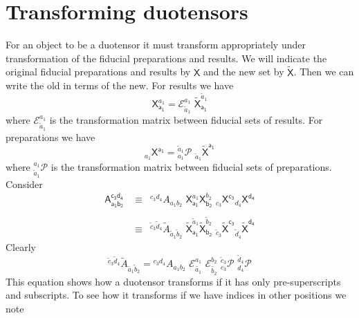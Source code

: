\documentclass[10pt]{article}
\begin{document}
\section{Transforming duotensors}\label{transformingduotensors}

For an object to be a duotensor it must transform appropriately under transformation of the fiducial preparations and results. We will indicate the original fiducial preparations and results by $\mathsf X$ and the new set by $\tilde{\mathsf X}$.  Then we can write the old in terms of the new. For results we have
\begin{equation}
\mathsf{X}_\mathsf{a_1}^{a_1} =   \mathcal{E}^{a_1}_{\tilde{a}_1} \,\, \mathsf{\tilde{X}}_\mathsf{a_1}^{\tilde{a}_1}
\end{equation}
where $\mathcal{E}^{a_1}_{\tilde{a}_1}$ is the transformation matrix between fiducial sets of results.  For preparations we have
\begin{equation}
{}_{a_1}\!\mathsf{X}^\mathsf{a_1} =   {}^{\tilde{a}_1}_{a_1}\! \mathcal{P}  \,\, {}_{\tilde{a}_1}\!\mathsf{\tilde{X}}^\mathsf{a_1}
\end{equation}
where ${}_{\tilde{a}_1}^{a_1}\!\mathcal{P}$ is the transformation matrix between fiducial sets of preparations.  Consider
\begin{eqnarray}
\mathsf{A_{a_1b_2}^{c_3d_4}} \,\,& \equiv & {}^{c_3d_4}\!A_{a_1b_2}\,\, \mathsf{X}_\mathsf{a_1}^{a_1} \mathsf{X}_\mathsf{b_2}^{b_2}  \,\,{}_{c_3}\!\mathsf{X}^\mathsf{c_3}{}_{d_4}\!\mathsf{X}^\mathsf{d_4}   \nonumber\\
& {} & \nonumber \\
& \equiv & {}^{\tilde{c}_3\tilde{d}_4}\!\tilde{A}_{\tilde{a}_1\tilde{b}_2}\,\, \mathsf{\tilde{X}}_\mathsf{{a}_1}^{\tilde{a}_1} \mathsf{\tilde{X}}_\mathsf{b_2}^{\tilde{b}_2}  \,\,{}_{\tilde{c}_3}\!\mathsf{\tilde{X}}^\mathsf{c_3}{}_{\tilde{d}_4}\!\mathsf{\tilde{X}}^\mathsf{d_4}
\nonumber
\end{eqnarray}
Clearly
\begin{equation}\label{presupsubtrans}
{}^{\tilde{c}_3\tilde{d}_4}\!\tilde{A}_{\tilde{a}_1\tilde{b}_2} =      {}^{c_3d_4}\!A_{a_1b_2} \,\,  \mathcal{E}^{a_1}_{\tilde{a_1}}\,\, \mathcal{E}^{b_2}_{\tilde{b_2}}   \,\, {}_{c_3}^{\tilde{c}_3} \mathcal{P} \,\,{}_{d_4}^{\tilde{d}_4} \mathcal{P}
\end{equation}
This equation shows how a duotensor transforms if it has only pre-superscripts and subscripts.  To see how it transforms if we have indices in other positions we note
\end{document}
